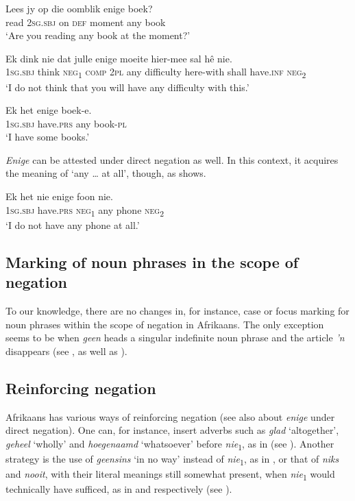 \documentclass[output=paper,colorlinks,citecolor=brown]{langscibook}
\begin{document}
    \ex\label{ex:afr:42c}
        \gll Lees jy op die oomblik enige boek? \\ 
             read \textsc{2sg.sbj} on \textsc{def} moment any book \\
        \glt ‘Are you reading any book at the moment?’
    
    \ex\label{ex:afr:42d}
        \gll Ek dink nie dat julle enige moeite hier-mee sal hê nie.\\
             \textsc{1sg.sbj} think \textsc{neg}\textsubscript{1} \textsc{comp} \textsc{2pl} any difficulty here-with shall have.\textsc{inf} \textsc{neg}\textsubscript{2} \\
        \glt ‘I do not think that you will have any difficulty with this.’
    
    \ex\label{ex:afr:42e}
        \gll *Ek het enige boek-e. \\
             \textsc{1sg.sbj} have.\textsc{prs} any book-\textsc{pl} \\
        \glt ‘I have some books.’
    \z
\z 

\textit{Enige} can be attested under direct negation as well. In this context, it acquires the meaning of ‘any … at all’, though, as  shows.

\ea\label{ex:afr:43}
    \gll Ek het nie enige foon nie. \\ 
         \textsc{1sg.sbj} have.\textsc{prs} \textsc{neg}\textsubscript{1} any phone \textsc{neg}\textsubscript{2} \\
    \glt ‘I do not have any phone at all.’
 
\z 

\subsection{Marking of noun phrases in the scope of negation}

To our knowledge, there are no changes in, for instance, case or focus marking for noun phrases within the scope of negation in Afrikaans. The only exception seems to be when \textit{geen} heads a singular indefinite noun phrase and the article \textit{’n} disappears (see , as well as \citealt[124]{Ponelis1979}).

\subsection{Reinforcing negation}
\label{sec:afr:4.4}
Afrikaans has various ways of reinforcing negation (see also  about \textit{enige} under direct negation). One can, for instance, insert adverbs such as \textit{glad} ‘altogether’, \textit{geheel} ‘wholly’ and \textit{hoegenaamd} ‘whatsoever’ before \textit{nie}\textsubscript{1}, as in  (see \citealt[26]{Ponelis1968}). Another strategy is the use of \textit{geensins} ‘in no way’ instead of \textit{nie}\textsubscript{1}, as in , or that of \textit{niks} and \textit{nooit}, with their literal meanings still somewhat present, when \textit{nie}\textsubscript{1} would technically have sufficed, as in  and  respectively (see \citealt[109--110]{Biberauer2008}).
\end{document}
